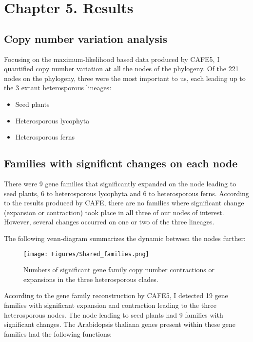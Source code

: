 \chapter{Chapter 5. Results}

\section{Copy number variation analysis}

Focusing on the maximum-likelihood based data produced by CAFE5,  I quantified copy number variation at all the nodes of the phylogeny. Of the 221 nodes on the phylogeny, three were the most important to us, each leading up to the 3 extant heterosporous lineages:

\begin{itemize}
    \item Seed plants
    \item Heterosporous lycophyta
    \item Heterosporous ferns
\end{itemize}

\section{Families with significnt changes on each node}

There were 9 gene families that significantly expanded on the node leading to seed plants, 6 to heterosporous lycophyta and 6 to heterosporous ferns. According to the results produced by CAFE, there are no families where significant change (expansion or contraction) took place in all three of our nodes of interest. However, several changes occurred on one or two of the three lineages.

The following venn-diagram summarizes the dynamic between the nodes further:

\begin{figure}[ht]
    \centering
    \texttt{[image: Figures/Shared\_families.png]}
    \caption[Numbers of significant gene family copy number contractions or expansions in the three heterosporous clades.
    ]{Numbers of significant gene family copy number contractions or expansions in the three heterosporous clades.
    }
    \label{fig 5.1}
\end{figure}

According to the gene family reconstruction by CAFE5, I detected 19 gene families with significant expansion and contraction leading to the three heterosporous nodes. The node leading to seed plants had 9 families with significant changes. The Arabidopsis thaliana genes present within these gene families had the following functions:

